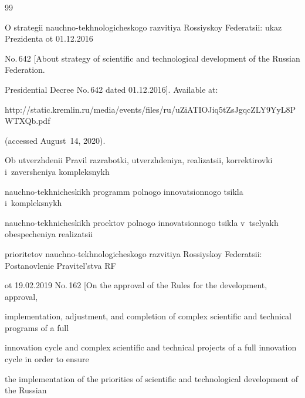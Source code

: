  



\vspace*{-12pt}



\renewcommand{\bibname}{\protect\rmfamily References}




{\small\frenchspacing

{%


\begin{thebibliography}{99}


O strategii nauchno-tekhnologicheskogo razvitiya Rossiyskoy Federatsii: ukaz Prezidenta ot 01.12.2016 

No.\,642 [About strategy of scientific and technological development of the Russian Federation. 

Presidential Decree No.\,642 dated 01.12.2016]. Available at: {\sf 

http://static.kremlin.ru/media/events/files/ru/uZiATIOJiq5tZsJgqcZLY9YyL8PW\linebreak TXQb.pdf} 

(accessed August~14, 2020).


Ob utverzhdenii Pravil razrabotki, utverzhdeniya, realizatsii, korrektirovki i~zaversheniya kompleksnykh 

nauchno-tekhnicheskikh programm polnogo innovatsionnogo tsikla i~kompleksnykh  

nauchno-tekhnicheskikh proektov polnogo innovatsionnogo tsikla v~tselyakh obespecheniya realizatsii 

prioritetov nauchno-tekhnologicheskogo razvitiya Rossiyskoy Federatsii: Postanovlenie Pravitel'stva RF 

ot 19.02.2019 No.\,162 [On the approval of the Rules for the development, approval, 

implementation, adjustment, and completion of complex scientific and technical programs of a full 

innovation cycle and complex scientific and technical projects of a full innovation cycle in order to ensure 

the implementation of the priorities of scientific and technological development of the Russian 


\end{thebibliography}}}
